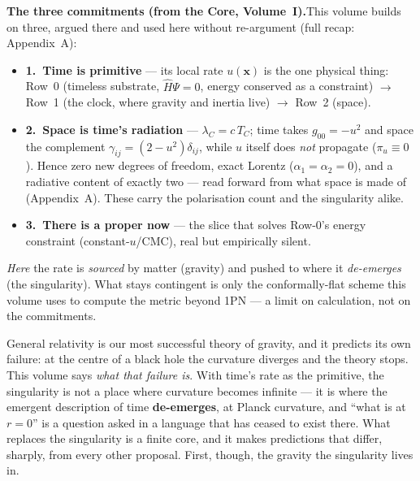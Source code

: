 \documentclass[11pt]{article}
\begin{document}
\bigskip

\begin{tcolorbox}
\textbf{The three commitments (from the Core, Volume~I).}\enspace This volume builds on three, argued there
and used here without re-argument (full recap: Appendix~A):
\begin{itemize}[leftmargin=1.4em,itemsep=1pt,topsep=3pt]
  \item \textbf{1.\ Time is primitive} --- its local rate $u(\mathbf x)$ is the one physical thing:
    Row~0 (timeless substrate, $\hat H\Psi=0$, energy conserved as a constraint) $\to$ Row~1 (the clock,
    where gravity and inertia live) $\to$ Row~2 (space).
  \item \textbf{2.\ Space is time's radiation} --- $\lambda_C=c\,T_C$; time takes $g_{00}=-u^2$ and space
    the complement $\gamma_{ij}=(2-u^2)\delta_{ij}$, while $u$ itself does \emph{not} propagate
    ($\pi_u\equiv0$). Hence zero new degrees of freedom, exact Lorentz ($\alpha_1=\alpha_2=0$), and a
    radiative content of exactly two --- read forward from what space is made of (Appendix~A). These carry
    the polarisation count and the singularity alike.
  \item \textbf{3.\ There is a proper now} --- the slice that solves Row-0's energy constraint
    (constant-$u$/CMC), real but empirically silent.
\end{itemize}
\noindent\emph{Here} the rate is \emph{sourced} by matter (gravity) and pushed to where it \emph{de-emerges}
(the singularity). What stays contingent is only the conformally-flat scheme this volume uses to compute the
metric beyond 1PN --- a limit on calculation, not on the commitments.
\end{tcolorbox}

\medskip
\noindent General relativity is our most successful theory of gravity, and it predicts its own failure:
at the centre of a black hole the curvature diverges and the theory stops. This volume says \emph{what
that failure is}. With time's rate as the primitive, the singularity is not a place where curvature
becomes infinite --- it is where the emergent description of time \textbf{de-emerges}, at Planck
curvature, and ``what is at $r=0$'' is a question asked in a language that has ceased to exist there.
What replaces the singularity is a finite core, and it makes predictions that differ, sharply, from
every other proposal. First, though, the gravity the singularity lives in.
\end{document}
